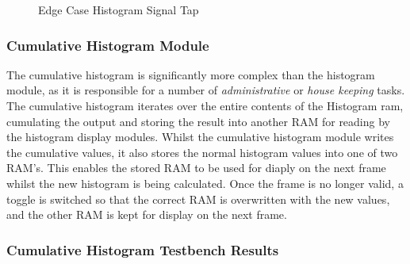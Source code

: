 \documentclass[12pt]{article}
\begin{document}
   \begin{figure}[H]
    \caption{Edge Case Histogram Signal Tap}
    \label{fig:histogram_signal_tap_edge_case_operation}
  \end{figure}
  \subsubsection{Cumulative Histogram Module}
  The cumulative histogram is significantly more complex than the histogram module, as it is responsible for a number of \textit{administrative} or \textit{house keeping} tasks. The cumulative histogram iterates over the entire contents of the Histogram ram, cumulating the output and storing the result into another RAM for reading by the histogram display modules. Whilst the cumulative histogram module writes the cumulative values, it also stores the normal histogram values into one of two RAM's. This enables the stored RAM to be used for diaply on the next frame whilst the new histogram is being calculated. Once the frame is no longer valid, a toggle is switched so that the correct RAM is overwritten with the new values, and the other RAM is kept for display on the next frame.

  \subsubsection{Cumulative Histogram Testbench Results}
\end{document}
